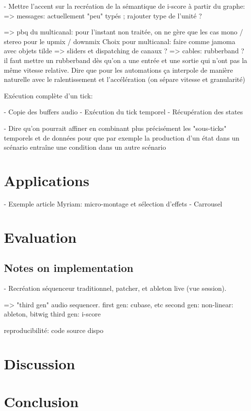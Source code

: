 \documentclass[applsci,article,submit,moreauthors,pdftex,10pt,a4paper]{mdpi}
\begin{document}
- Mettre l'accent sur la recréation de la sémantique de i-score à partir du graphe: 
=> messages: actuellement "peu" typés ; rajouter type de l'unité ? 

=> pbq du multicanal: pour l'instant non traitée, on ne gère que les cas mono / stereo pour le upmix / downmix
Choix pour multicanal: faire comme jamoma avec objets tilde
=> sliders et dispatching de canaux ?
=> cables: rubberband ? il faut mettre un rubberband dès qu'on a une entrée et une sortie qui n'ont pas la même vitesse relative. Dire que pour les automations ça interpole de manière naturelle avec le ralentissement et l'accélération (on sépare vitesse et granularité)

Exécution complète d'un tick: 

- Copie des buffers audio
- Exécution du tick temporel
- Récupération des states

- Dire qu'on pourrait affiner en combinant plus précisément les "sous-ticks" temporels et de données
pour que par exemple la production d'un état dans un scénario entraîne une condition dans un autre scénario


\section{Applications}
- Exemple article Myriam: micro-montage et sélection d'effets
- Carrousel
\section{Evaluation}
\subsection{Notes on implementation}
- Recréation séquenceur traditionnel, patcher, et ableton live (vue session).


=> "third gen" audio sequencer.
first gen: cubase, etc
second gen: non-linear: ableton, bitwig
third gen: i-score

reproducibilité: code source dispo
\section{Discussion}
\section{Conclusion}


\end{document}
